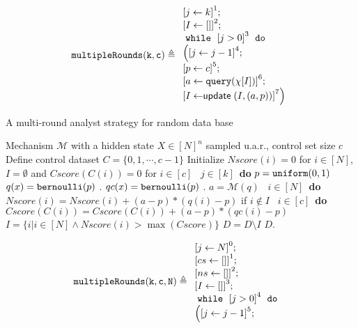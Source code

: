 \begin{example}
%
\[
%
\kw{multipleRounds(k, c)} \triangleq
\begin{array}{l}
     \left[j \leftarrow k \right]^1 ; \\
    \left[I \leftarrow [] \right]^2; \\
    \ewhile ~ \clabel{j > 0}^{3} ~ \edo ~ \\
    \Big(
    \clabel{\assign{j}{j-1}}^{4} ;\\
    \left[p \leftarrow c \right]^5; \\
    \left[ a \leftarrow \query (\chi[I]) \right]^6;\\
    \left[I \leftarrow \mathrel{\mathsf{update}} ( {I}, (a, p))  \right]^7
    \Big) 
\end{array}
\]
%
\begin{algorithm}
\footnotesize
\caption{A multi-round analyst strategy for random data base \cite{dwork2015preserving}}
\label{alg:multiRound}
\begin{algorithmic}
\REQUIRE Mechanism $\mathcal{M}$ with a hidden state $X\in [N]^{n}$ sampled u.a.r., control set size $c$
\STATE Define control dataset $C = \{0,1, \cdots, c - 1\}$
\STATE Initialize $Nscore(i) = 0$ for $i \in [N]$, $I = \emptyset$ and $Cscore(C(i)) = 0$ for $i \in [c]$
\ $j\in [k]$\ {\bf do} 
\STATE {} $p=\mathtt{uniform}(0,1)$ 
\STATE {} $q (x) = \mathtt{bernoulli} ( p )$ .
\STATE {} $qc (x) = \mathtt{bernoulli} ( p )$ .
\STATE {} $a = \mathcal{M}(q)$ 
\STATE {}\ $i \in [N]$\ {\bf do}
\STATE \qquad \qquad $Nscore(i) = Nscore(i) + (a - p)*(q (i) - p)$ if $i \notin I$
\STATE {}\ $i \in [c]$\ {\bf do}
\STATE \qquad \qquad $Cscore(C(i)) = Cscore(C(i)) + (a - p)*(qc (i) - p)$
\STATE {} $I = \{i | i\in [N] \land Nscore(i) > \max(Cscore)\}$
\STATE {} $D = D \setminus I$ 
\RETURN $D$.
\end{algorithmic}
\end{algorithm}
%
\[
%
\kw{multipleRounds(k, c, N)} \triangleq
\begin{array}{l}
    \clabel{\assign{j}{N}}^0 ; \\
     \clabel{\assign{cs}{[]}}^1; \\
     \clabel{\assign{ns}{[]}}^2; \\
     \clabel{\assign{I}{[]}}^3; \\
     \ewhile ~ \clabel{j > 0}^{4} ~ \edo ~ \\
     \Big(
     \clabel{\assign{j}{j-1}}^{5} ;\\

\end{array}\]
\end{example}
